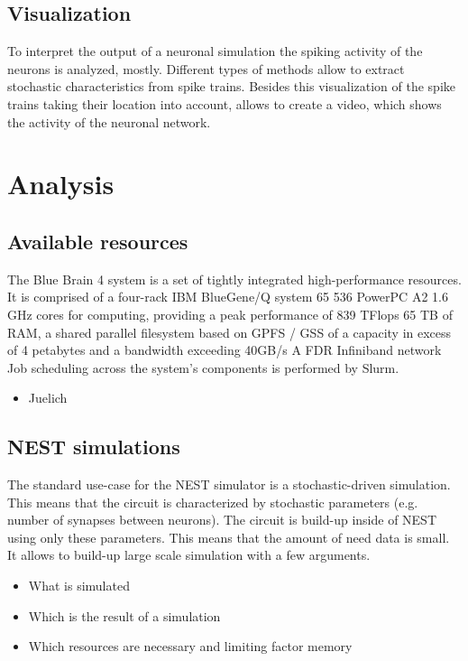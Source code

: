 \documentclass[a4paper]{article}
\begin{document}
\subsection{Visualization}
To interpret the output of a neuronal simulation the spiking activity of the neurons is analyzed, mostly. Different types of methods allow to extract stochastic characteristics from spike trains. Besides this visualization of the spike trains taking their location into account, allows to create a video, which shows the activity of the neuronal network.




\section{Analysis}

\subsection{Available resources}   
The Blue Brain 4 system is a set of tightly integrated high-performance resources. It is comprised of a four-rack IBM BlueGene/Q system 65 536 PowerPC A2 1.6 GHz cores for computing, providing a peak performance of 839 TFlops 65 TB of RAM, a shared parallel filesystem based on GPFS / GSS of a capacity in excess of 4 petabytes and a bandwidth exceeding 40GB/s A FDR Infiniband network Job scheduling across the system's components is performed by Slurm. 

\begin{itemize}
      \item Juelich
\end{itemize}


\subsection{NEST simulations}
The standard use-case for the NEST simulator is a stochastic-driven simulation. This means
that the circuit is characterized by stochastic parameters (e.g. number of synapses between neurons).
The circuit is build-up inside of NEST using only these parameters.
This means that the amount of need data is small. It allows to build-up large scale simulation
with a few arguments.

\begin{itemize}
      \item What is simulated
      \item Which is the result of a simulation
      \item Which resources are necessary and limiting factor memory
\end{itemize}
\end{document}
